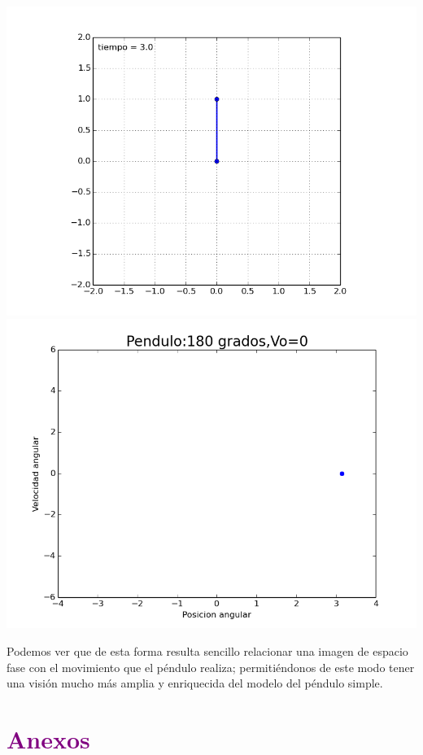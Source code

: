 \documentclass[12pt]{article}
\begin{document}
\begin{center}
\includegraphics[scale=0.5]{180.png}
\includegraphics[scale=0.5]{figure_180.png}
\end{center}
Podemos ver que de esta forma resulta sencillo relacionar una imagen de espacio fase con el movimiento que el péndulo realiza; permitiéndonos de este modo tener una visión mucho más amplia y enriquecida del modelo del péndulo simple.

\pagebreak
\section*{\textcolor{Purple}{Anexos}}
\end{document}
